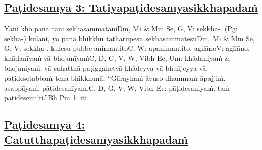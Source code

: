 \subsection*{\hyperref[ack3]{Pāṭidesanīyā 3: Tatiyapāṭidesanīyasikkhāpadaṁ}}
\label{pd3}

Yāni kho pana tāni sekhasammatāni\makeatletter\hyperlink{endnote-appendix}\makeatother Dm, Mi & Mm Se, G, V: sekkha-. (Pg: sekha-) kulāni, yo pana bhikkhu tathārūpesu sekhasammatesu\makeatletter\hyperlink{endnote-appendix}\makeatother Dm, Mi & Mm Se, G, V: sekkha-. kulesu pubbe animantito\makeatletter\hyperlink{endnote-appendix}\makeatother C, W: apanimantito. agilāno\makeatletter\hyperlink{endnote-appendix}\makeatother V: agīlāno. khādanīyaṁ vā bhojanīyaṁ\makeatletter\hyperlink{endnote-appendix}\makeatother C, D, G, V, W, Vibh Ee, Um: khādaniyaṁ & bhojaniyaṁ. vā sahatthā paṭiggahetvā khādeyya vā bhuñjeyya vā, paṭidesetabbaṁ tena bhikkhunā, ``Gārayhaṁ āvuso dhammaṁ āpajjiṁ, asappāyaṁ, pāṭidesanīyaṁ,\makeatletter\hyperlink{endnote-appendix}\makeatother C, D, G, V, W, Vibh Ee: pāṭidesaniyaṁ. taṁ paṭidesemī'ti.''\makeatletter\hyperlink{endnote-appendix}\makeatother Bh Pm 1: iti.



\subsection*{\hyperref[ack4]{Pāṭidesanīyā 4: Catutthapāṭidesanīyasikkhāpadaṁ}}
\label{pd4}

